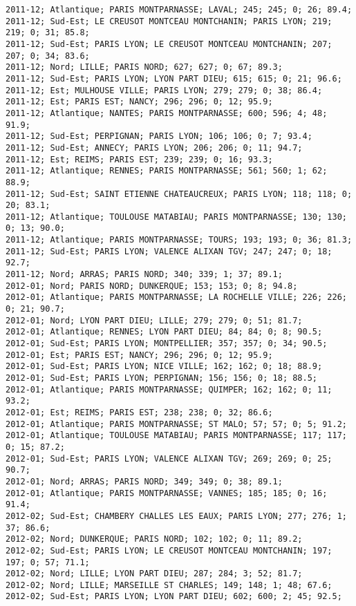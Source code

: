 \documentclass{article}
\begin{document}
\begin{Verbatim}[commandchars=\\\{\}]
2011-12; Atlantique; PARIS MONTPARNASSE; LAVAL; 245; 245; 0; 26; 89.4; 
2011-12; Sud-Est; LE CREUSOT MONTCEAU MONTCHANIN; PARIS LYON; 219; 219; 0; 31; 85.8; 
2011-12; Sud-Est; PARIS LYON; LE CREUSOT MONTCEAU MONTCHANIN; 207; 207; 0; 34; 83.6; 
2011-12; Nord; LILLE; PARIS NORD; 627; 627; 0; 67; 89.3; 
2011-12; Sud-Est; PARIS LYON; LYON PART DIEU; 615; 615; 0; 21; 96.6; 
2011-12; Est; MULHOUSE VILLE; PARIS LYON; 279; 279; 0; 38; 86.4; 
2011-12; Est; PARIS EST; NANCY; 296; 296; 0; 12; 95.9; 
2011-12; Atlantique; NANTES; PARIS MONTPARNASSE; 600; 596; 4; 48; 91.9; 
2011-12; Sud-Est; PERPIGNAN; PARIS LYON; 106; 106; 0; 7; 93.4; 
2011-12; Sud-Est; ANNECY; PARIS LYON; 206; 206; 0; 11; 94.7; 
2011-12; Est; REIMS; PARIS EST; 239; 239; 0; 16; 93.3; 
2011-12; Atlantique; RENNES; PARIS MONTPARNASSE; 561; 560; 1; 62; 88.9; 
2011-12; Sud-Est; SAINT ETIENNE CHATEAUCREUX; PARIS LYON; 118; 118; 0; 20; 83.1; 
2011-12; Atlantique; TOULOUSE MATABIAU; PARIS MONTPARNASSE; 130; 130; 0; 13; 90.0; 
2011-12; Atlantique; PARIS MONTPARNASSE; TOURS; 193; 193; 0; 36; 81.3; 
2011-12; Sud-Est; PARIS LYON; VALENCE ALIXAN TGV; 247; 247; 0; 18; 92.7; 
2011-12; Nord; ARRAS; PARIS NORD; 340; 339; 1; 37; 89.1; 
2012-01; Nord; PARIS NORD; DUNKERQUE; 153; 153; 0; 8; 94.8; 
2012-01; Atlantique; PARIS MONTPARNASSE; LA ROCHELLE VILLE; 226; 226; 0; 21; 90.7; 
2012-01; Nord; LYON PART DIEU; LILLE; 279; 279; 0; 51; 81.7; 
2012-01; Atlantique; RENNES; LYON PART DIEU; 84; 84; 0; 8; 90.5; 
2012-01; Sud-Est; PARIS LYON; MONTPELLIER; 357; 357; 0; 34; 90.5; 
2012-01; Est; PARIS EST; NANCY; 296; 296; 0; 12; 95.9; 
2012-01; Sud-Est; PARIS LYON; NICE VILLE; 162; 162; 0; 18; 88.9; 
2012-01; Sud-Est; PARIS LYON; PERPIGNAN; 156; 156; 0; 18; 88.5; 
2012-01; Atlantique; PARIS MONTPARNASSE; QUIMPER; 162; 162; 0; 11; 93.2; 
2012-01; Est; REIMS; PARIS EST; 238; 238; 0; 32; 86.6; 
2012-01; Atlantique; PARIS MONTPARNASSE; ST MALO; 57; 57; 0; 5; 91.2; 
2012-01; Atlantique; TOULOUSE MATABIAU; PARIS MONTPARNASSE; 117; 117; 0; 15; 87.2; 
2012-01; Sud-Est; PARIS LYON; VALENCE ALIXAN TGV; 269; 269; 0; 25; 90.7; 
2012-01; Nord; ARRAS; PARIS NORD; 349; 349; 0; 38; 89.1; 
2012-01; Atlantique; PARIS MONTPARNASSE; VANNES; 185; 185; 0; 16; 91.4; 
2012-02; Sud-Est; CHAMBERY CHALLES LES EAUX; PARIS LYON; 277; 276; 1; 37; 86.6; 
2012-02; Nord; DUNKERQUE; PARIS NORD; 102; 102; 0; 11; 89.2; 
2012-02; Sud-Est; PARIS LYON; LE CREUSOT MONTCEAU MONTCHANIN; 197; 197; 0; 57; 71.1; 
2012-02; Nord; LILLE; LYON PART DIEU; 287; 284; 3; 52; 81.7; 
2012-02; Nord; LILLE; MARSEILLE ST CHARLES; 149; 148; 1; 48; 67.6; 
2012-02; Sud-Est; PARIS LYON; LYON PART DIEU; 602; 600; 2; 45; 92.5; 

\end{Verbatim}
\end{document}
